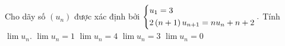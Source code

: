 \begin{ex}%
	Cho dãy số $\left({{u}_{n}}\right)$ được xác định bởi $ \left\{\begin{aligned}& {{u}_{1}}=3\\ & 2\left( n+1 \right){{u}_{n+1}}=n{{u}_{n}}+n+2\end{aligned}\right..$ 
	Tính  $\lim {{u}_{n}}$.
	\choice
	{ \True   $\lim{{u}_{n}}=1$}
	{ $ \lim{{u}_{n}}=4 $}
	{ $\lim{{u}_{n}}=3$}
	{ $\lim{{u}_{n}}=0$}
	
	\end{ex}

